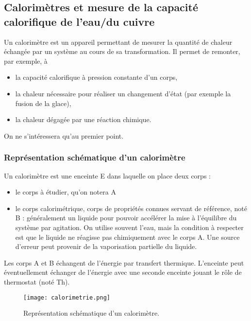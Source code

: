 \documentclass[11pt,a4paper]{report}
\begin{document}
\subsection{Calorimètres et mesure de la capacité calorifique de l'eau/du cuivre}

Un calorimètre est un appareil permettant de mesurer la quantité de chaleur échangée par un système au cours de sa transformation. Il permet de remonter, par exemple, à
\begin{itemize}
	\item la capacité calorifique à pression constante d'un corps,
	\item la chaleur nécessaire pour réaliser un changement d'état (par exemple la fusion de la glace),
	\item la chaleur dégagée par une réaction chimique.\\
\end{itemize}

On ne s'intéressera qu'au premier point.

\subsubsection{Représentation schématique d'un calorimètre}

Un calorimètre est une enceinte E dans laquelle on place deux corps : 
\begin{itemize}
	\item le corps à étudier, qu'on notera A
	\item le corps calorimétrique, corps de propriétés connues servant de référence, noté B : généralement un liquide pour pouvoir accélérer la mise à l'équilibre du système par agitation. On utilise souvent l'eau, mais la condition à respecter est que le liquide ne réagisse pas chimiquement avec le corps A. Une source d'erreur peut provenir de la vaporisation partielle du liquide.
\end{itemize}
Les corps A et B échangent de l'énergie par transfert thermique. L'enceinte peut éventuellement échanger de l'énergie avec une seconde enceinte jouant le rôle de thermostat (noté Th).\\

\begin{figure}[h!]
\begin{center}
	\texttt{[image: calorimetrie.png]}
	\caption{Représentation schématique d'un calorimètre.} 
	\label{fig:calorimetrie}
\end{center}
\end{figure}
\end{document}
